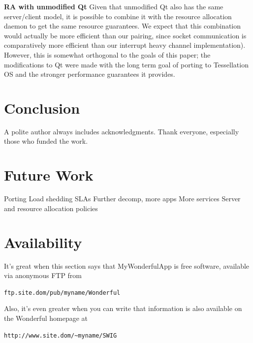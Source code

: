 \documentclass[letterpaper,twocolumn,10pt]{article}
\begin{document}
\textbf{RA with unmodified Qt} Given that unmodified Qt also has the same server/client model, it is possible to combine it with the resource allocation daemon to get the same resource guarantees. We expect that this combination would actually be more efficient than our pairing, since socket communication is comparatively more efficient than our interrupt heavy channel implementation). However, this is somewhat orthogonal to the goals of this paper; the modifications to Qt were made with the long term goal of porting to Tessellation OS and the stronger performance guarantees it provides.

\section{Conclusion}

A polite author always includes acknowledgments.  Thank everyone,
especially those who funded the work. 

\section{Future Work}
Porting
Load shedding
SLAs
Further decomp, more apps
More services
Server and resource allocation policies

\section{Availability}

It's great when this section says that MyWonderfulApp is free software, 
available via anonymous FTP from

\begin{center}
{\tt ftp.site.dom/pub/myname/Wonderful}\\
\end{center}

Also, it's even greater when you can write that information is also 
available on the Wonderful homepage at 

\begin{center}
{\tt http://www.site.dom/\~{}myname/SWIG}
\end{center}

\footnotesize{
}

\theendnotes
\end{document}
